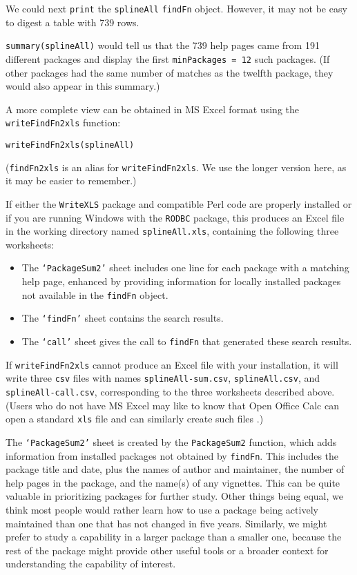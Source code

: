 We could next {\tt print} the {\tt splineAll} {\tt findFn}
object.  However, it may not be easy to digest a table
with 739 rows.

{\tt summary(splineAll)} would tell us that the 739 help pages
came from 191 different packages and display the first
{\tt minPackages = 12} such packages.
(If other packages had the same number of
matches as the twelfth package, they would also appear in this
summary.)

A more complete view can be obtained in MS Excel format
using the {\tt writeFindFn2xls} function:
\begin{verbatim}
writeFindFn2xls(splineAll)
\end{verbatim}
({\tt findFn2xls} is an alias for {\tt writeFindFn2xls}.  
We use the longer version here, as it may be 
easier to remember.)  

If either the {\tt WriteXLS} package and compatible Perl code
are properly installed or if you are running Windows with
the {\tt RODBC} package, this produces an Excel file in the
working directory named {\tt splineAll.xls}, containing the
following three worksheets:

\begin{itemize}
\item{The {\tt `PackageSum2'} sheet includes one line for each
package with a matching help page, enhanced by providing
information for locally installed packages
not available in the {\tt findFn} object.}
\item{The {\tt `findFn'} sheet contains the search results.}
\item{The {\tt `call'} sheet gives the call to {\tt findFn}
that generated these search results.}
\end{itemize}

If {\tt writeFindFn2xls} cannot produce an Excel file with
your installation, it will write three {\tt csv} files with
names {\tt splineAll-sum.csv}, {\tt splineAll.csv}, and
{\tt splineAll-call.csv}, corresponding to the three
worksheets described above. (Users who do not have MS Excel
may like to know that Open Office Calc can open a standard
{\tt xls} file and can similarly create such files
\citep{CALC09MAN}.)

The {\tt `PackageSum2'} sheet is created by the
{\tt PackageSum2} function, which adds information from
installed packages not obtained by
{\tt findFn}.  This includes the package title and date, plus
the names of author and maintainer, the number of help pages
in the package,
and the name(s) of any vignettes.  This can be quite
valuable in prioritizing packages for further study.
Other things being equal, we think most people would
rather learn how to use a package being actively maintained
than one that has not changed in five years.  Similarly,
we might prefer to study a capability in a larger package
than a smaller one, because the rest of the package might
provide other useful tools or a broader context for
understanding the capability of interest.

